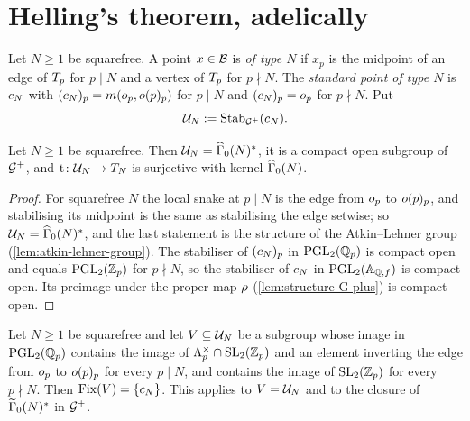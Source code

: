 \section{Helling's theorem, adelically}\label{sec:helling}

\begin{definition}\label{def:points-of-type}
Let $N \geq 1$ be squarefree. A point $x \in \mathcal{B}$ is \emph{of type
$N$} if $x_p$ is the midpoint of an edge of $T_{p}$ for $p \mid N$ and a
vertex of $T_{p}$ for $p \nmid N$. The \emph{standard point of type $N$}
is $c_{N}$ with $(c_{N})_p =
m(o_{p},o(p)_{p})$ for $p \mid N$ and
$(c_{N})_p = o_{p}$ for $p \nmid N$. Put
\[
  \mathcal{U}_{N} := \operatorname{Stab}_{\mathcal{G}^{+}}(c_{N}).
\]
\end{definition}

\begin{lemma}\label{lem:U_N}
Let $N \geq 1$ be squarefree. Then $\MaxCompact{N} = \GammaZeroStar[ad]{N}$,
it is a compact open subgroup of $\mathcal{G}^{+}$, and
$\mathrm{t} \colon \mathcal{U}_{N} \to T_{N}$ is surjective with kernel
$\GammaZero[ad]{N}$.
\end{lemma}

\begin{proof}
For squarefree $N$ the local snake at $p \mid N$ is the edge from
$o_{p}$ to $o(p)_{p}$, and stabilising its
midpoint is the same as stabilising the edge setwise; so
$\MaxCompact{N} = \GammaZeroStar[ad]{N}$, and the last statement is the
structure of the Atkin--Lehner group (\cref{lem:atkin-lehner-group}). The
stabiliser of $(c_{N})_p$ in $\PGL{2}{\pAdicNumbers{p}}$ is compact
open and equals $\PGL{2}{\pAdicIntegers{p}}$ for $p \nmid N$, so the stabiliser
of $c_{N}$ in $\PGL{2}{\FiniteAdeles{\QQ}}$ is compact open. Its
preimage under the proper map $\rho$
(\cref{lem:structure-G-plus}) is compact open.
\end{proof}

\begin{lemma}\label{lem:U_N-fixed}
Let $N \geq 1$ be squarefree and let $V \subseteq \mathcal{U}_{N}$ be a
subgroup whose image in $\PGL{2}{\pAdicNumbers{p}}$ contains the image of
$\unit{\IwahoriOrder{p}}\cap\SL{2}{\pAdicIntegers{p}}$ and an element
inverting the edge from $o_{p}$ to $o(p)_{p}$ for
every $p \mid N$, and contains the image of $\SL{2}{\pAdicIntegers{p}}$ for
every $p \nmid N$. Then $\mathrm{Fix}(V) = \{c_{N}\}$. This applies to
$V = \mathcal{U}_{N}$ and to the closure of $\GammaZeroStar[lift]{N}$ in
$\mathcal{G}^{+}$.
\end{lemma}

